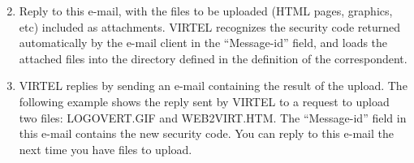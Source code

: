 \documentclass[letterpaper,10pt,english]{sphinxmanual}
\begin{document}
\begin{enumerate}
\setcounter{enumi}{1}
\item {} 
Reply to this e-mail, with the files to be uploaded (HTML pages, graphics, etc) included as attachments. VIRTEL recognizes the security code returned automatically by the e-mail client in the “Message-id” field, and loads the attached files into the directory defined in the definition of the correspondent.

\item {} 
VIRTEL replies by sending an e-mail containing the result of the upload. The following example shows the reply sent by VIRTEL to a request to upload two files: LOGOVERT.GIF and WEB2VIRT.HTM. The “Message-id” field in this e-mail contains the new security code. You can reply to this e-mail the next time you have files to upload.

\end{enumerate}
\end{document}
